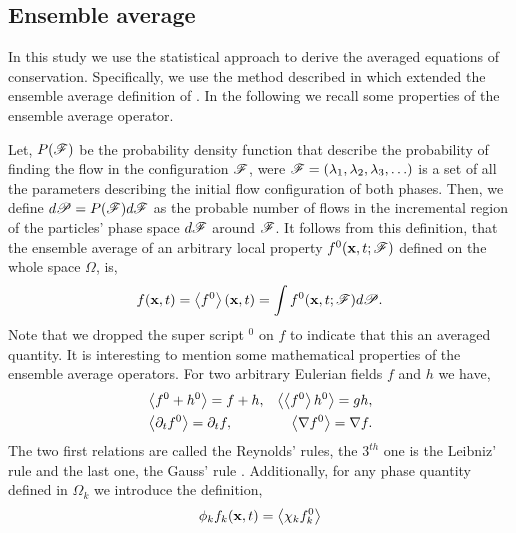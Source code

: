 
\subsection{Ensemble average}
In this study we use the statistical approach to derive the averaged equations of conservation. 
Specifically, we use the method described in \citet{zhang2021ensemble} which extended the ensemble average definition of \citet{batchelor1972sedimentation}. 
In the following we recall some properties of the ensemble average operator. 

Let, $P(\mathscr{F})$ be the probability density function that describe the probability of finding the flow in the configuration $\mathscr{F}$, were $\mathscr{F} = (\lambda_1,\lambda_2,\lambda_3,\ldots)$ is a set of all the parameters describing the initial flow configuration of both phases.
Then, we define $d\mathscr{P} = P(\mathscr{F})d\mathscr{F}$ as the probable number of flows in the incremental region of the particles' phase space $d\mathscr{F}$ around $\mathscr{F}$. 
It follows from this definition, that the ensemble average of an arbitrary local property $f^0(\textbf{x},t;\mathscr{F})$ defined on the whole space $\Omega$, is,
\begin{equation}
    f(\textbf{x},t)
    = \left<f^0\right>(\textbf{x},t)
    =\int f^0(\textbf{x},t;\mathscr{F}) d\mathscr{P}. 
    \label{eq:avg}
\end{equation}  
Note that we dropped the super script $^0$ on $f$ to indicate that this an averaged quantity. 
It is interesting to mention some mathematical properties of the ensemble average operators. 
For two arbitrary Eulerian fields $f$ and $h$ we have,
\begin{align}
    &\left<f^0+h^0\right> = f+h, 
    &\left<\left<f^0\right>h^0\right> = gh, \nonumber \\
    &\left<\partial_t f^0\right> 
    = \partial_t f, 
    &\left<\mathbf{\nabla} f^0\right>
    = \mathbf{\nabla} f. 
    \label{eq:avg_properties}
\end{align}
The two first relations are called the Reynolds' rules, the $3^{th}$ one is the Leibniz' 
rule and the last one, the Gauss' rule \citep{drew1983mathematical}.
Additionally, for any phase quantity defined in $\Omega_k$ we introduce the definition, 
\begin{equation}
    \phi_k f_k (\textbf{x},t) = \left<\chi_k f_k^0\right>
    \label{eq:1_avg}
\end{equation}
